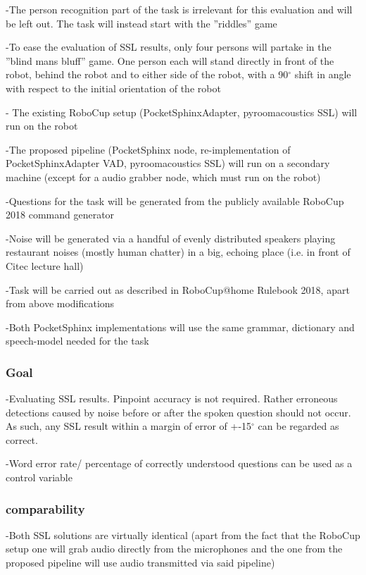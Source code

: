 -The person recognition part of the task is irrelevant for this evaluation and will be left out. The task will instead start with the ''riddles'' game

-To ease the evaluation of SSL results, only four persons will partake in the ''blind mans bluff'' game. One person each will stand directly in front of the robot, behind the robot and to either side of the robot, with a 90$^\circ$ shift in angle with respect to the initial orientation of the robot

- The existing RoboCup setup (PocketSphinxAdapter, pyroomacoustics SSL) will run on the robot

-The proposed pipeline (PocketSphinx node, re-implementation of PocketSphinxAdapter VAD, pyroomacoustics SSL) will run on a secondary machine (except for a audio grabber node, which must run on the robot)

-Questions for the task will be generated from the publicly available RoboCup 2018 command generator

-Noise will be generated via a handful of evenly distributed speakers playing restaurant noises (mostly human chatter) in a big, echoing place (i.e. in front of Citec lecture hall)

-Task will be carried out as described in RoboCup@home Rulebook 2018, apart from above modifications

-Both PocketSphinx implementations will use the same grammar, dictionary and speech-model needed for the task

\subsubsection{Goal}
-Evaluating SSL results. Pinpoint accuracy is not required. Rather erroneous detections caused by noise before or after the spoken question should not occur. As such, any SSL result within a margin of error of +-15$^\circ$  can be regarded as correct. 

-Word error rate/ percentage of correctly understood questions can be used as a control variable 

\subsubsection{comparability}
-Both SSL solutions are virtually identical (apart from the fact that the RoboCup setup one will grab audio directly from the microphones and the one from the proposed pipeline will use audio transmitted via said pipeline)


